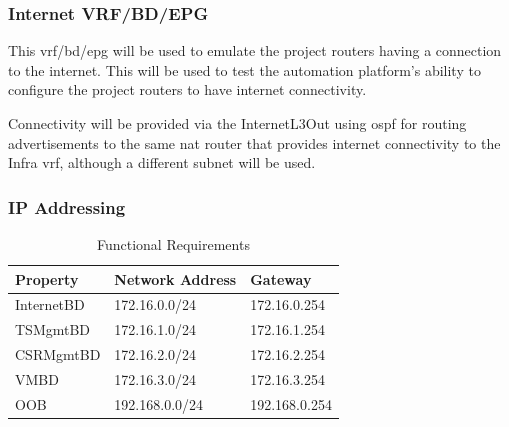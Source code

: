 \subsubsection{Internet VRF/BD/EPG}
This \gls{vrf}/\gls{bd}/\gls{epg} will be
used to emulate the project routers having a connection to the internet. This
will be used to test the automation platform's ability to configure the project
routers to have internet connectivity.

Connectivity will be provided via the
InternetL3Out using \gls{ospf} for routing advertisements to the same \gls{nat}
router that provides internet connectivity to the Infra \gls{vrf}, although a
different subnet will be used.

\subsubsection{IP Addressing}
\begin{table}[H]
    \centering
    \begin{tabular}{l l l}
        \hline

        \textbf{Property} & \textbf{Network Address}
                    &
        \textbf{Gateway}
        \\ \hline
        InternetBD  &
        172.16.0.0/24
                    & 172.16.0.254
        \\ \hline

        TSMgmtBD    & 172.16.1.0/24            & 172.16.1.254
        \\ \hline

        CSRMgmtBD   & 172.16.2.0/24            & 172.16.2.254
        \\ \hline

        VMBD        & 172.16.3.0/24            & 172.16.3.254
        \\ \hline
        OOB & 192.168.0.0/24 & 192.168.0.254
    \end{tabular}

    \caption{Functional Requirements}
\end{table}